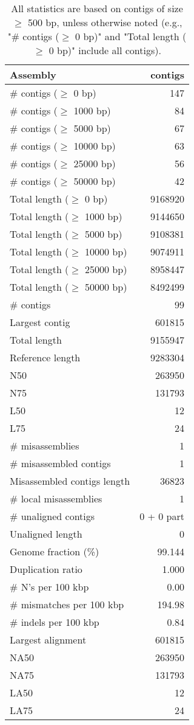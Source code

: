 \documentclass[12pt,a4paper]{article}
\begin{document}
\begin{table}[ht]
\begin{center}
\caption{All statistics are based on contigs of size $\geq$ 500 bp, unless otherwise noted (e.g., "\# contigs ($\geq$ 0 bp)" and "Total length ($\geq$ 0 bp)" include all contigs).}
\begin{tabular}{|l*{1}{|r}|}
\hline
Assembly & contigs \\ \hline
\# contigs ($\geq$ 0 bp) & 147 \\ \hline
\# contigs ($\geq$ 1000 bp) & 84 \\ \hline
\# contigs ($\geq$ 5000 bp) & 67 \\ \hline
\# contigs ($\geq$ 10000 bp) & 63 \\ \hline
\# contigs ($\geq$ 25000 bp) & 56 \\ \hline
\# contigs ($\geq$ 50000 bp) & 42 \\ \hline
Total length ($\geq$ 0 bp) & 9168920 \\ \hline
Total length ($\geq$ 1000 bp) & 9144650 \\ \hline
Total length ($\geq$ 5000 bp) & 9108381 \\ \hline
Total length ($\geq$ 10000 bp) & 9074911 \\ \hline
Total length ($\geq$ 25000 bp) & 8958447 \\ \hline
Total length ($\geq$ 50000 bp) & 8492499 \\ \hline
\# contigs & 99 \\ \hline
Largest contig & 601815 \\ \hline
Total length & 9155947 \\ \hline
Reference length & 9283304 \\ \hline
N50 & 263950 \\ \hline
N75 & 131793 \\ \hline
L50 & 12 \\ \hline
L75 & 24 \\ \hline
\# misassemblies & 1 \\ \hline
\# misassembled contigs & 1 \\ \hline
Misassembled contigs length & 36823 \\ \hline
\# local misassemblies & 1 \\ \hline
\# unaligned contigs & 0 + 0 part \\ \hline
Unaligned length & 0 \\ \hline
Genome fraction (\%) & 99.144 \\ \hline
Duplication ratio & 1.000 \\ \hline
\# N's per 100 kbp & 0.00 \\ \hline
\# mismatches per 100 kbp & 194.98 \\ \hline
\# indels per 100 kbp & 0.84 \\ \hline
Largest alignment & 601815 \\ \hline
NA50 & 263950 \\ \hline
NA75 & 131793 \\ \hline
LA50 & 12 \\ \hline
LA75 & 24 \\ \hline
\end{tabular}
\end{center}
\end{table}
\end{document}
